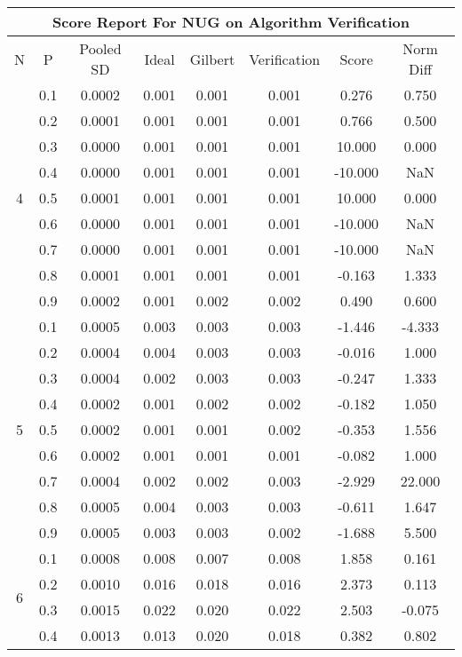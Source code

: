 \documentclass[11pt,a4paper]{report}
\begin{document}
\begin{longtable}{ | c | c || c | c | c | c | c | c | }
\hline
\multicolumn{8}{|c|}{ Score Report For NUG on Algorithm Verification} \\
\hline
N & P & Pooled SD &  Ideal &  Gilbert & Verification  & Score & Norm Diff \\
 \hline
 \hline
 \endhead
\multirow{9}{*}{4} & 0.1 & 0.0002 & 0.001 & 0.001 & 0.001 & 0.276 & 0.750 \\
 & 0.2 & 0.0001 & 0.001 & 0.001 & 0.001 & 0.766 & 0.500 \\
 & 0.3 & 0.0000 & 0.001 & 0.001 & 0.001 & 10.000 & 0.000 \\
 & 0.4 & 0.0000 & 0.001 & 0.001 & 0.001 & -10.000 & NaN \\
 & 0.5 & 0.0001 & 0.001 & 0.001 & 0.001 & 10.000 & 0.000 \\
 & 0.6 & 0.0000 & 0.001 & 0.001 & 0.001 & -10.000 & NaN \\
 & 0.7 & 0.0000 & 0.001 & 0.001 & 0.001 & -10.000 & NaN \\
 & 0.8 & 0.0001 & 0.001 & 0.001 & 0.001 & -0.163 & 1.333 \\
 & 0.9 & 0.0002 & 0.001 & 0.002 & 0.002 & 0.490 & 0.600 \\
 \hline
\multirow{9}{*}{5} & 0.1 & 0.0005 & 0.003 & 0.003 & 0.003 & -1.446 & -4.333 \\
 & 0.2 & 0.0004 & 0.004 & 0.003 & 0.003 & -0.016 & 1.000 \\
 & 0.3 & 0.0004 & 0.002 & 0.003 & 0.003 & -0.247 & 1.333 \\
 & 0.4 & 0.0002 & 0.001 & 0.002 & 0.002 & -0.182 & 1.050 \\
 & 0.5 & 0.0002 & 0.001 & 0.001 & 0.002 & -0.353 & 1.556 \\
 & 0.6 & 0.0002 & 0.001 & 0.001 & 0.001 & -0.082 & 1.000 \\
 & 0.7 & 0.0004 & 0.002 & 0.002 & 0.003 & -2.929 & 22.000 \\
 & 0.8 & 0.0005 & 0.004 & 0.003 & 0.003 & -0.611 & 1.647 \\
 & 0.9 & 0.0005 & 0.003 & 0.003 & 0.002 & -1.688 & 5.500 \\
 \hline
\multirow{9}{*}{6} & 0.1 & 0.0008 & 0.008 & 0.007 & 0.008 & 1.858 & 0.161 \\
 & 0.2 & 0.0010 & 0.016 & 0.018 & 0.016 & 2.373 & 0.113 \\
 & 0.3 & 0.0015 & 0.022 & 0.020 & 0.022 & 2.503 & -0.075 \\
 & 0.4 & 0.0013 & 0.013 & 0.020 & 0.018 & 0.382 & 0.802 \\

\end{longtable}
\end{document}

